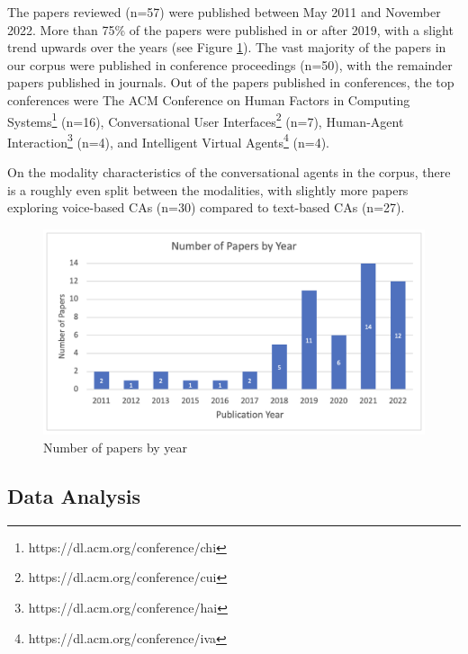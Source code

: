 \documentclass[sigconf,screen,review, anonymous]{acmart}
\begin{document}
The papers reviewed (n=57) were published between May 2011 and November 2022. More than 75\% of the papers were published in or after 2019, with a slight trend upwards over the years (see Figure \ref{fig:paper}). The vast majority of the papers in our corpus were published in conference proceedings (n=50), with the remainder papers published in journals. Out of the papers published in conferences, the top conferences were The ACM Conference on Human Factors in Computing Systems\footnote{https://dl.acm.org/conference/chi} (n=16), Conversational User Interfaces\footnote{https://dl.acm.org/conference/cui} (n=7), Human-Agent Interaction\footnote{https://dl.acm.org/conference/hai} (n=4), and Intelligent Virtual Agents\footnote{https://dl.acm.org/conference/iva} (n=4). 

On the modality characteristics of the conversational agents in the corpus, there is a roughly even split between the modalities, with slightly more papers exploring voice-based CAs (n=30) compared to text-based CAs (n=27).

\begin{figure}[h]
  \centering
  \includegraphics[width=\columnwidth]{fig-paper.png}
  \caption{Number of papers by year}
  \label{fig:paper}
\end{figure}

\subsection{Data Analysis}
\end{document}
